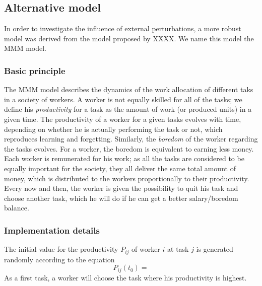 \subsection{Alternative model}

In order to investigate the influence of external perturbations, a more robust model was derived from the model proposed by XXXX. We name this model the MMM model.

\subsubsection{Basic principle}
The MMM model describes the dynamics of the work allocation of different taks in a society of workers. 
A worker is not equally skilled for all of the tasks; we define his \emph{productivity} for a task as the amount of work (or produced units) in a given time. 
The productivity of a worker for a given tasks evolves with time, depending on whether he is actually performing the task or not, which reproduces learning and forgetting. Similarly, the \emph{boredom} of the worker regarding the tasks evolves. For a worker, the boredom is equivalent to earning less money.
Each worker is remunerated for his work; as all the tasks are considered to be equally important for the society, they all deliver the same total amount of money, which is distributed to the workers proportionally to their productivity.
Every now and then, the worker is given the possibility to quit his task and choose another task, which he will do if he can get a better salary/boredom balance. 


\subsubsection{Implementation details}
The initial value for the productivity $P_{ij}$ of worker $i$ at task $j$ is generated randomly according to the equation
\begin{equation}
	P_{ij}(t_0) = 
\end{equation}
As a first task, a worker will choose the task where his productivity is highest.

